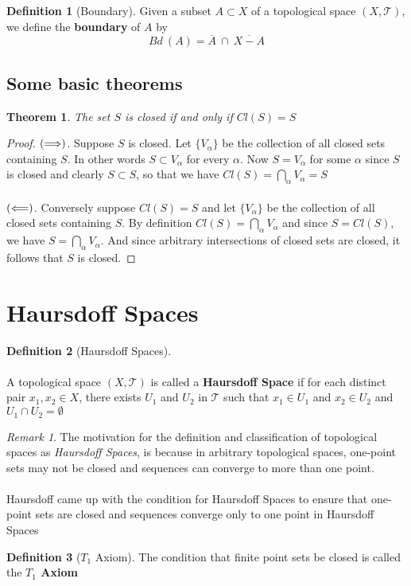 \documentclass{article}
\newtheorem{theorem}{Theorem}[section]
\theoremstyle{remark}
\newtheorem*{remark}{Remark}
\theoremstyle{definition}
\newtheorem{definition}{Definition}[section]
\newcommand{\simplies}{\DOTSB\Longrightarrow}
\newcommand{\lsimplies}{\DOTSB\Longleftarrow}
\begin{document}
\medskip

\begin{definition}[Boundary]
Given a subset $A \subset X$ of a topological space $(X , \mathcal{T})$, we define the \textbf{boundary} of $A$ by $$Bd \ (A) = \overline{A} \ \cap \ \overline{X-A}$$
\end{definition}

\newpage

\subsection{Some basic theorems}

\begin{theorem}
The set $S$ is closed if and only if $Cl(S) = S$
\end{theorem}

\begin{proof}[Proof]
$(\simplies)$. Suppose $S$ is closed. Let $\{V_{\alpha}\}$ be the collection of all closed sets containing $S$. In other words $S \subset V_{\alpha}$ for every $\alpha$. Now $S = V_{\alpha}$ for some $\alpha$ since $S$ is closed and clearly $S \subset S$, so that we have $Cl(S) = \bigcap_{\alpha}V_{\alpha} = S$
\\ \\ 
$(\lsimplies)$. Conversely suppose $Cl(S) = S$ and let $\{V_{\alpha}\}$ be the collection of all closed sets containing $S$. By definition $Cl(S) = \bigcap_{\alpha}V_{\alpha}$ and since $S = Cl(S)$, we have $S = \bigcap_{\alpha}V_{\alpha}$. And since arbitrary intersections of closed sets are closed, it follows that $S$ is closed.
\end{proof}

\newpage

\section{Haursdoff Spaces}
\bigskip
\begin{definition}[Haursdoff Spaces]
\\ \\
A topological space $(X, \mathcal{T})$ is called a \textbf{Haursdoff Space} if for each distinct pair $x_1, x_2 \in X$, there exists $U_1$ and $U_2$ in $\mathcal{T}$ such that $x_1 \in U_1$ and $x_2 \in U_2$ and $U_1 \cap U_2 = \emptyset$
\end{definition}
\medskip
\begin{remark}
The motivation for the definition and classification of topological spaces as \textit{Haursdoff Spaces}, is because in arbitrary topological spaces, one-point sets may not be closed and sequences can converge to more than one point. 
\\ \\
Haursdoff came up with the condition for Haursdoff Spaces to ensure that one-point sets are closed and sequences converge only to one point in Haursdoff Spaces
\end{remark}

\begin{definition}[$T_1$ Axiom]
The condition that finite point sets be closed is called the \textbf{$T_1$ Axiom}

\end{definition}
\end{document}
